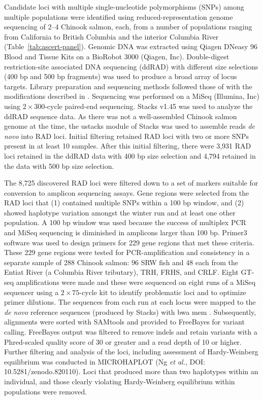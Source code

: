 Candidate loci with multiple single-nucleotide polymorphisms (SNPs) among multiple
populations were identified using reduced-representation genome sequencing of 2--4 Chinook salmon, each, from a number of
populations ranging from California to British
Columbia and the interior Columbia River (Table~\ref{tab:ascert-panel}).
Genomic DNA was extracted using Qiagen DNeasy 96 Blood and Tissue Kits on a BioRobot 3000
(Qiagen, Inc). Double-digest restriction-site associated DNA sequencing (ddRAD) with different size selections (400 bp and 500 bp
fragments) was used to produce a broad array of locus targets. Library preparation and sequencing methods followed those of
\citet{peterson2012double} with the modifications described in \citet{baetscher2018microhaplotypes}.
Sequencing was performed on a MiSeq (Illumina, Inc) using $2 \times 300$-cycle paired-end sequencing.
Stacks v1.45 \citep{catchen2013stacks} was used to analyze the ddRAD sequence data.  As there was not a well-assembled Chinook salmon genome
at the time, the ustacks module of Stacks was used to assemble reads {\em de novo} into RAD loci.  Initial filtering retained RAD loci with two or more SNPs present
in at least 10 samples. After this initial filtering, there were 3,931 RAD loci retained in the ddRAD data with 400 bp size selection and
4,794 retained in the data with 500 bp size selection.

The 8,725 discovered RAD loci were filtered down to a set of markers suitable for conversion
to amplicon sequencing assays. Gene regions were selected from the RAD loci that (1) contained multiple SNPs within a 100 bp window,
and (2) showed haplotype variation amongst the winter run and at least one other population.
A 100 bp window was used because the success of multiplex PCR and MiSeq sequencing is
diminished in amplicons larger than 100 bp. Primer3
software \citep{untergasser2012primer3} was used to design primers for 229 gene regions that met these criteria.
These 229 gene regions were tested for PCR-amplification and consistency in a separate sample
of 288 Chinook salmon: 96 SRW fish and 48 each from the Entiat River (a Columbia River
tributary), TRH, FRHS, and CRLF\@.  Eight GT-seq amplifications were made and these were sequenced
on eight runs of a MiSeq sequencer
using a $2\times 75$-cycle kit to identify problematic loci and to optimize primer dilutions.
The sequences from each run at each locus were mapped to the {\em de novo} reference sequences (produced by Stacks) with
bwa mem \citep{bwa-mem2009}. 
Subsequently, alignments were sorted with SAMtools \citep{li2009sequence} and provided to
FreeBayes \citep{garrison2012haplotype} for variant calling.
FreeBayes output was filtered to remove indels and retain variants with a Phred-scaled quality score of 30
or greater and a read depth of 10 or higher. Further filtering and analysis of the loci, including
assessment of Hardy-Weinberg equilibrium \citep{hardy1908mendelian} was conducted in MICROHAPLOT (Ng {\em et al.}, DOI: 10.5281/zenodo.820110).  Loci that produced more than two haplotypes within an individual, and those clearly violating Hardy-Weinberg equilibrium within populations were removed.


